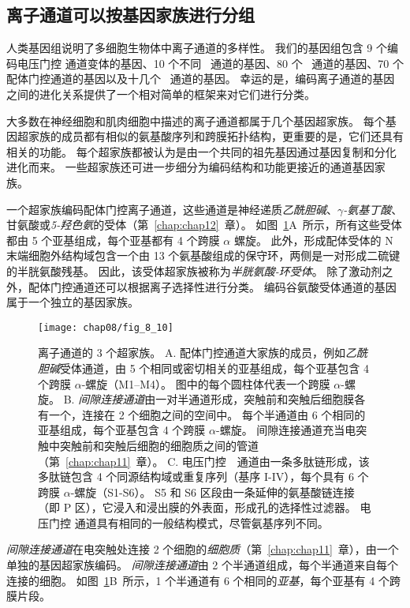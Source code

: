 \subsection{离子通道可以按基因家族进行分组}

人类基因组说明了多细胞生物体中离子通道的多样性。
我们的基因组包含 9 个编码电压门控  通道变体的基因、10 个不同~ 通道的基因、80 个~ 通道的基因、70 个配体门控通道的基因以及十几个~ 通道的基因。
幸运的是，编码离子通道的基因之间的进化关系提供了一个相对简单的框架来对它们进行分类。


大多数在神经细胞和肌肉细胞中描述的离子通道都属于几个基因超家族。
每个基因超家族的成员都有相似的氨基酸序列和跨膜拓扑结构，更重要的是，它们还具有相关的功能。
每个超家族都被认为是由一个共同的祖先基因通过基因复制和分化进化而来。
一些超家族还可进一步细分为编码结构和功能更接近的通道基因家族。


一个超家族编码配体门控离子通道，这些通道是神经递质\textit{乙酰胆碱}、\textit{$\gamma$-氨基丁酸}、甘氨酸或\textit{5-羟色氨}的受体（第~\ref{chap:chap12}~章）。 
如图~\ref{fig:8_10}A~所示，所有这些受体都由 5 个亚基组成，每个亚基都有 4 个跨膜 $\alpha$ 螺旋。
此外，形成配体受体的 N 末端细胞外结构域包含一个由 13 个氨基酸组成的保守环，两侧是一对形成二硫键的半胱氨酸残基。
因此，该受体超家族被称为\textit{半胱氨酸-环受体}。
除了激动剂之外，配体门控通道还可以根据离子选择性进行分类。
编码谷氨酸受体通道的基因属于一个独立的基因家族。


\begin{figure}[htbp]
	\centering
	\texttt{[image: chap08/fig\_8\_10]}
	\caption{离子通道的 3 个超家族。
		A. 配体门控通道大家族的成员，例如\textit{乙酰胆碱}受体通道，由 5 个相同或密切相关的亚基组成，每个亚基包含 4 个跨膜 $\alpha$-螺旋（M1–M4）。
		图中的每个圆柱体代表一个跨膜 $\alpha$-螺旋。
		B. \textit{间隙连接通道}由一对半通道形成，突触前和突触后细胞膜各有一个，连接在 2 个细胞之间的空间中。
		每个半通道由 6 个相同的亚基组成，每个亚基包含 4 个跨膜 $\alpha$-螺旋。
		间隙连接通道充当电突触中突触前和突触后细胞的细胞质之间的管道（第~\ref{chap:chap11}~章）。
		C. 电压门控~~通道由一条多肽链形成，该多肽链包含 4 个同源结构域或重复序列（基序 I-IV），每个具有 6 个跨膜 $\alpha$-螺旋（S1-S6）。
		S5 和 S6 区段由一条延伸的氨基酸链连接（即 P 区），它浸入和浸出膜的外表面，形成孔的选择性过滤器。
		电压门控  通道具有相同的一般结构模式，尽管氨基序列不同。}
	\label{fig:8_10}
\end{figure}




\textit{间隙连接通道}在电突触处连接 2 个细胞的\textit{细胞质}（第~\ref{chap:chap11}~章），由一个单独的基因超家族编码。
\textit{间隙连接通道}由 2 个半通道组成，每个半通道来自每个连接的细胞。
如图~\ref{fig:8_10}B~所示，1 个半通道有 6 个相同的\textit{亚基}，每个亚基有 4 个跨膜片段。



